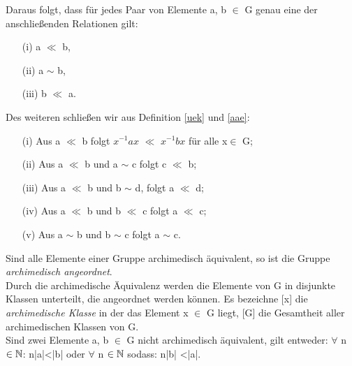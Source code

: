 \begin{folg}
Daraus folgt, dass für jedes Paar von Elemente a, b $\in$ G genau eine der anschließenden Relationen gilt: 
\begin{multicols}{3}
\begin{enumerate}
\item[(i)] a $\ll$ b, 
\item[(ii)] a $\sim$ b,
\item[(iii)] b $\ll$ a. 
\end{enumerate}
\end{multicols}
%
Des weiteren schließen wir aus Definition \ref{uek} und \ref{aae}:
\begin{enumerate}
\item[(i)] Aus a $\ll$ b folgt $x^{-1}ax $ $\ll$ $x^{-1}bx$ für alle x$\in$ G;
\item[(ii)] Aus a $\ll$ b und a $\sim$ c folgt c $\ll$ b;
\item[(iii)] Aus a $\ll$ b und b $\sim$ d, folgt a $\ll$ d;
\item[(iv)] Aus a $\ll$ b und b $\ll$ c folgt a $\ll$ c;
\item[(v)] Aus a $\sim$ b und b $\sim$ c folgt a $\sim$ c.
\end{enumerate}
Sind alle Elemente einer Gruppe archimedisch äquivalent, so ist die Gruppe \textit{archimedisch angeordnet}. \\ 
Durch die archimedische Äquivalenz werden die Elemente von G in disjunkte Klassen unterteilt, die angeordnet werden können. Es bezeichne [x] die \textit{archimedische Klasse} in der das Element x $\in$ G liegt, [G] die Gesamtheit aller archimedischen Klassen von G. \\
Sind zwei Elemente a, b $\in$ G nicht archimedisch äquivalent, gilt entweder:
$\forall$ n $\in \mathbb{N}$: n|a|<|b| oder $\forall$ n $\in \mathbb{N} $ sodass: n|b| <|a|.
\end{folg}
%
%
%
